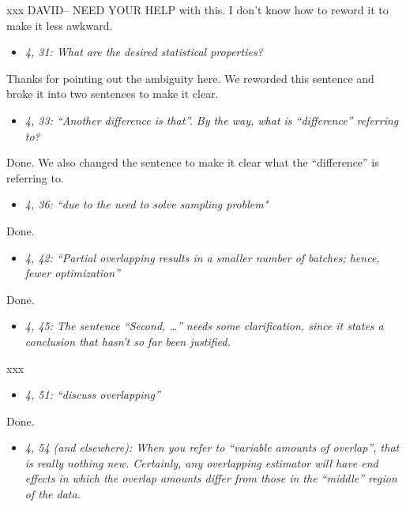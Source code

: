 \documentclass[11pt,notitlepage,onecolumn]{article}
\newcommand{\noi}{\noindent}
\begin{document}
\noi
xxx   DAVID-- NEED YOUR HELP with this. 
I don't know how to reword it to make it less awkward.
\medskip 


\begin{itemize}
\item[] \textit{4, 31: What are the desired statistical properties?}
\end{itemize}

\noi
Thanks for pointing out the ambiguity here. 
We reworded this sentence and broke it into two sentences to make it clear. 
\medskip 


\begin{itemize}
\item[] \textit{4, 33: ``Another difference is that''. By the way, what is ``difference'' referring to?}
\end{itemize}

\noi
Done.
We also changed the sentence to make it clear what the ``difference'' is referring to. 
\medskip 


\begin{itemize}
\item[] \textit{4, 36: ``due to the need to solve sampling problem"}
\end{itemize}

\noi
Done.  
\medskip 


\begin{itemize}
\item[] \textit{4, 42: ``Partial overlapping results in a smaller number of batches; hence, fewer optimization''}
\end{itemize}

\noi
Done.  
\medskip 


\begin{itemize}
\item[] \textit{4, 45: The sentence ``Second, \ldots '' needs some clarification, since it states a conclusion that hasn't so far been justified.}
\end{itemize}

\noi
xxx  
\medskip 


\begin{itemize}
\item[] \textit{4, 51: ``discuss overlapping''}
\end{itemize}

\noi
Done.  
\medskip 


\begin{itemize}
\item[] \textit{4, 54 (and elsewhere): When you refer to ``variable amounts of overlap'', that is really nothing new. Certainly, any overlapping estimator will have end effects in which the overlap amounts differ from those in the ``middle'' region of the data.}
\end{itemize}
\end{document}

